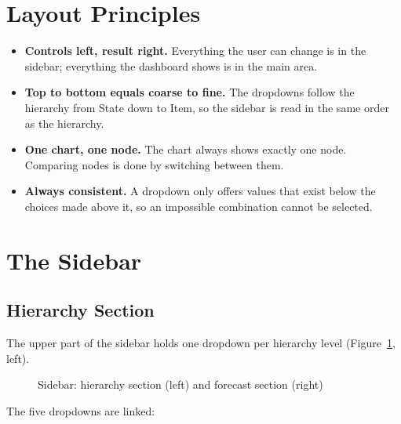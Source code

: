 \section{Layout Principles}
\label{sec:uiPrinciples}

\begin{itemize}
  \item \textbf{Controls left, result right.} Everything the user can change is in the sidebar; everything the dashboard shows is in the main area.
  \item \textbf{Top to bottom equals coarse to fine.} The dropdowns follow the hierarchy from State down to Item, so the sidebar is read in the same order as the hierarchy.
  \item \textbf{One chart, one node.} The chart always shows exactly one node. Comparing nodes is done by switching between them.
  \item \textbf{Always consistent.} A dropdown only offers values that exist below the choices made above it, so an impossible combination cannot be selected.
\end{itemize}

\section{The Sidebar}
\label{sec:uiSidebar}

\subsection{Hierarchy Section}
\label{sec:uiHierarchy}

The upper part of the sidebar  holds one dropdown per hierarchy level (Figure~\ref{fig:uiSidebar}, left).

\begin{figure}[H]
  \centering
  \hfill
  \caption{Sidebar: hierarchy section (left) and forecast section (right)}
  \label{fig:uiSidebar}
\end{figure}

The five dropdowns are linked:

